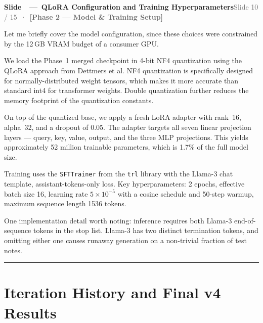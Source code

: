 \documentclass[11pt,a4paper]{article}
\newcommand{\phaselabel}[2]{\textbf{\textcolor{#1}{[#2]}}}
\newcounter{slidectr}
\newcommand{\slidescript}[3]{%
  \stepcounter{slidectr}
  \begin{slidebox}
    \noindent\textbf{Slide \theslidectr\ \,—\, #1}\hfill\small\textcolor{dimgray}{#2}
  \end{slidebox}
  \vspace{0.4em}
  #3
  \vspace{1.2em}
  \noindent\textcolor{dimgray!60}{\rule{\linewidth}{0.4pt}}
  \vspace{0.6em}
}
\begin{document}
\slidescript{QLoRA Configuration and Training Hyperparameters}{Slide 10 / 15 \,·\, \phaselabel{phase2}{Phase 2 — Model \& Training Setup}}{

Let me briefly cover the model configuration, since these choices were constrained by the 12\,GB VRAM budget of a consumer GPU.

We load the Phase~1 merged checkpoint in 4-bit NF4 quantization using the QLoRA approach from Dettmers et al. NF4 quantization is specifically designed for normally-distributed weight tensors, which makes it more accurate than standard int4 for transformer weights. Double quantization further reduces the memory footprint of the quantization constants.

On top of the quantized base, we apply a fresh LoRA adapter with rank~16, alpha~32, and a dropout of 0.05. The adapter targets all seven linear projection layers — query, key, value, output, and the three MLP projections. This yields approximately 52 million trainable parameters, which is 1.7\% of the full model size.

Training uses the \texttt{SFTTrainer} from the \texttt{trl} library with the Llama-3 chat template, assistant-tokens-only loss. Key hyperparameters: 2 epochs, effective batch size 16, learning rate $5\times10^{-5}$ with a cosine schedule and 50-step warmup, maximum sequence length 1536 tokens.

One implementation detail worth noting: inference requires both Llama-3 end-of-sequence tokens in the stop list. Llama-3 has two distinct termination tokens, and omitting either one causes runaway generation on a non-trivial fraction of test notes.

}

\section{Iteration History and Final v4 Results}
\end{document}
